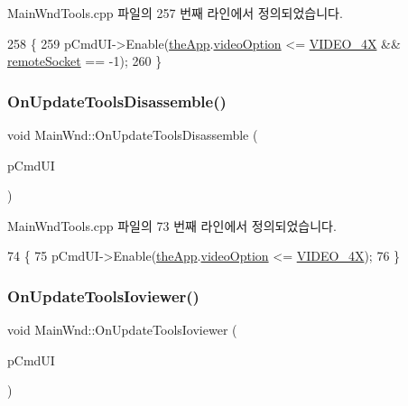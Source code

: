 Main\+Wnd\+Tools.\+cpp 파일의 257 번째 라인에서 정의되었습니다.


\begin{DoxyCode}
258 \{
259   pCmdUI->Enable(\mbox{\hyperlink{_v_b_a_8cpp_a8095a9d06b37a7efe3723f3218ad8fb3}{theApp}}.\mbox{\hyperlink{class_v_b_a_a17dac073149c897f770c00ed7098ad32}{videoOption}} <= \mbox{\hyperlink{_v_b_a_8h_a531c35e38ede3ea4e5ba5afb24b29493a6468bce6b84e6350d3de126f257eb38d}{VIDEO\_4X}} && 
      \mbox{\hyperlink{_main_wnd_tools_8cpp_a4fdb1b96f709fc5cdd1d013c1703e484}{remoteSocket}} == -1);
260 \}
\end{DoxyCode}
\mbox{\label{class_main_wnd_aea8ccf27ebeaa61f96f6818d4c4ead3a}} 
\subsubsection{\texorpdfstring{On\+Update\+Tools\+Disassemble()}{OnUpdateToolsDisassemble()}}
{\footnotesize\ttfamily void Main\+Wnd\+::\+On\+Update\+Tools\+Disassemble (\begin{DoxyParamCaption}\item[{C\+Cmd\+UI $\ast$}]{p\+Cmd\+UI }\end{DoxyParamCaption})\hspace{0.3cm}{\ttfamily [protected]}}



Main\+Wnd\+Tools.\+cpp 파일의 73 번째 라인에서 정의되었습니다.


\begin{DoxyCode}
74 \{
75   pCmdUI->Enable(\mbox{\hyperlink{_v_b_a_8cpp_a8095a9d06b37a7efe3723f3218ad8fb3}{theApp}}.\mbox{\hyperlink{class_v_b_a_a17dac073149c897f770c00ed7098ad32}{videoOption}} <= \mbox{\hyperlink{_v_b_a_8h_a531c35e38ede3ea4e5ba5afb24b29493a6468bce6b84e6350d3de126f257eb38d}{VIDEO\_4X}});
76 \}
\end{DoxyCode}
\mbox{\label{class_main_wnd_a0ad22b86f8eac276ed6be53909f1400f}} 
\subsubsection{\texorpdfstring{On\+Update\+Tools\+Ioviewer()}{OnUpdateToolsIoviewer()}}
{\footnotesize\ttfamily void Main\+Wnd\+::\+On\+Update\+Tools\+Ioviewer (\begin{DoxyParamCaption}\item[{C\+Cmd\+UI $\ast$}]{p\+Cmd\+UI }\end{DoxyParamCaption})\hspace{0.3cm}{\ttfamily [protected]}}



